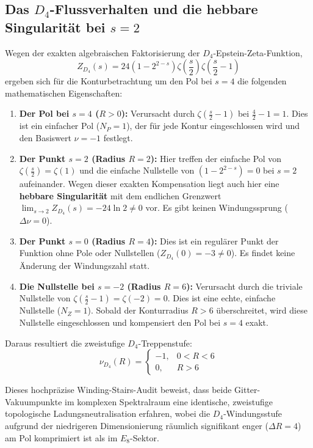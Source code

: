 \documentclass[11pt,a4paper]{article}
\begin{document}
	\subsection{Das $D_4$-Flussverhalten und die hebbare Singularität bei $s=2$}
	Wegen der exakten algebraischen Faktorisierung der $D_4$-Epstein-Zeta-Funktion,
	\begin{equation}
		Z_{D_4}(s) = 24 \left(1 - 2^{2-s}\right) \zeta\left(\frac{s}{2}\right) \zeta\left(\frac{s}{2}-1\right)
	\end{equation}
	ergeben sich für die Konturbetrachtung um den Pol bei $s=4$ die folgenden mathematischen Eigenschaften:
	\begin{enumerate}
		\item \textbf{Der Pol bei $s = 4$ ($R > 0$):} Verursacht durch $\zeta\left(\frac{s}{2}-1\right)$ bei $\frac{4}{2}-1 = 1$. Dies ist ein einfacher Pol ($N_P = 1$), der für jede Kontur eingeschlossen wird und den Basiswert $\nu = -1$ festlegt.
		\item \textbf{Der Punkt $s = 2$ (Radius $R = 2$):} Hier treffen der einfache Pol von $\zeta\left(\frac{s}{2}\right) = \zeta(1)$ und die einfache Nullstelle von $(1 - 2^{2-s}) = 0$ bei $s=2$ aufeinander. Wegen dieser exakten Kompensation liegt auch hier eine \textbf{hebbare Singularität} mit dem endlichen Grenzwert $\lim_{s\to2} Z_{D_4}(s) = -24 \ln 2 \neq 0$ vor. Es gibt keinen Windungssprung ($\Delta \nu = 0$).
		\item \textbf{Der Punkt $s = 0$ (Radius $R = 4$):} Dies ist ein regulärer Punkt der Funktion ohne Pole oder Nullstellen ($Z_{D_4}(0) = -3 \neq 0$). Es findet keine Änderung der Windungszahl statt.
		\item \textbf{Die Nullstelle bei $s = -2$ (Radius $R = 6$):} Verursacht durch die triviale Nullstelle von $\zeta\left(\frac{s}{2}-1\right) = \zeta(-2) = 0$. Dies ist eine echte, einfache Nullstelle ($N_Z = 1$). Sobald der Konturradius $R > 6$ überschreitet, wird diese Nullstelle eingeschlossen und kompensiert den Pol bei $s=4$ exakt.
	\end{enumerate}
	Daraus resultiert die zweistufige $D_4$-Treppenstufe:
	\begin{equation}
		\nu_{D_4}(R) = \begin{cases} -1, & 0 < R < 6 \\ 0, & R > 6 \end{cases}
	\end{equation}
	
	Dieses hochpräzise Winding-Stairs-Audit beweist, dass beide Gitter-Vakuumpunkte im komplexen Spektralraum eine identische, zweistufige topologische Ladungsneutralisation erfahren, wobei die $D_4$-Windungsstufe aufgrund der niedrigeren Dimensionierung räumlich signifikant enger ($\Delta R = 4$) am Pol komprimiert ist als im $E_8$-Sektor.
	
\end{document}
